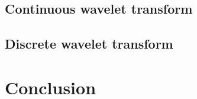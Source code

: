 \subsection{Continuous wavelet transform}

\subsection{Discrete wavelet transform}


\section{Conclusion}